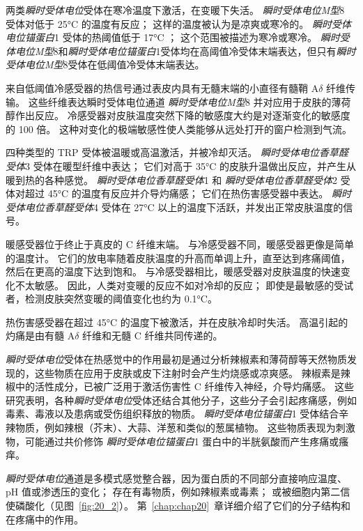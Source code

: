 两类\textit{瞬时受体电位}受体在寒冷温度下激活，在变暖下失活。
\textit{瞬时受体电位M型}8 受体对低于 25°C 的温度有反应； 这样的温度被认为是凉爽或寒冷的。
\textit{瞬时受体电位锚蛋白}1 受体的热阈值低于 17°C ；
这个范围被描述为寒冷或寒冷。
\textit{瞬时受体电位M型}8和\textit{瞬时受体电位锚蛋白}1受体均在高阈值冷受体末端表达，但只有\textit{瞬时受体电位M型}8受体在低阈值冷受体末端表达。


来自低阈值冷感受器的热信号通过表皮内具有无髓末端的小直径有髓鞘 A$\delta$ 纤维传输。
这些纤维表达瞬时受体电位通道 \textit{瞬时受体电位M型}8 并对应用于皮肤的薄荷醇作出反应。
冷感受器对皮肤温度突然下降的敏感度大约是对逐渐变化的敏感度的 100 倍。
这种对变化的极端敏感性使人类能够从远处打开的窗户检测到气流。


四种类型的 TRP 受体被温暖或高温激活，并被冷却灭活。
\textit{瞬时受体电位香草醛受体}3 受体在暖型纤维中表达； 它们对高于 35°C 的皮肤升温做出反应，并产生从暖到热的各种感觉。
\textit{瞬时受体电位香草醛受体}1 和 \textit{瞬时受体电位香草醛受体}2 受体对超过 45°C 的温度有反应并介导灼痛感；
它们在热伤害感受器中表达。 
\textit{瞬时受体电位香草醛受体}4 受体在 27°C 以上的温度下活跃，并发出正常皮肤温度的信号。


暖感受器位于终止于真皮的 C 纤维末端。
与冷感受器不同，暖感受器更像是简单的温度计。
它们的放电率随着皮肤温度的升高而单调上升，直至达到疼痛阈值，然后在更高的温度下达到饱和。
与冷感受器相比，暖感受器对皮肤温度的快速变化不太敏感。
因此，人类对变暖的反应不如对冷却的反应；
即使是最敏感的受试者，检测皮肤突然变暖的阈值变化也约为 0.1°C。


热伤害感受器在超过 45°C 的温度下被激活，并在皮肤冷却时失活。
高温引起的灼痛是由有髓 A$\delta$ 纤维和无髓 C 纤维共同传递的。


\textit{瞬时受体电位}受体在热感觉中的作用最初是通过分析辣椒素和薄荷醇等天然物质发现的，这些物质在应用于皮肤或皮下注射时会产生灼烧感或凉爽感。
辣椒素是辣椒中的活性成分，已被广泛用于激活伤害性 C 纤维传入神经，介导灼痛感。
这些研究表明，各种\textit{瞬时受体电位}受体还结合其他分子，这些分子会引起疼痛感，例如毒素、毒液以及患病或受伤组织释放的物质。
\textit{瞬时受体电位锚蛋白}1 受体结合辛辣物质，例如辣根（芥末）、大蒜、洋葱和类似的葱属植物。
这些物质表现为刺激物，可能通过共价修饰 \textit{瞬时受体电位锚蛋白}1 蛋白中的半胱氨酸而产生疼痛或瘙痒。


\textit{瞬时受体电位}通道是多模式感觉整合器，因为蛋白质的不同部分直接响应温度、pH 值或渗透压的变化；
存在有毒物质，例如辣椒素或毒素；
或被细胞内第二信使磷酸化（见图~\ref{fig:20_2}）。
第~\ref{chap:chap20}~章详细介绍了它们的分子结构和在疼痛中的作用。




